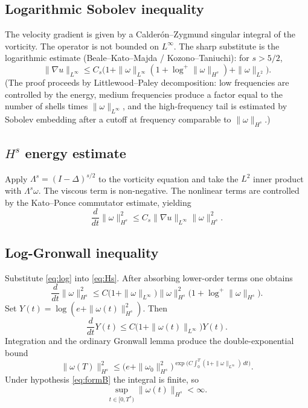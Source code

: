 \documentclass[11pt,a4paper]{article}
\begin{document}
\subsection{Logarithmic Sobolev inequality}
The velocity gradient is given by a Calder\'on--Zygmund singular integral of the vorticity. The operator is not bounded on \(L^\infty\). The sharp substitute is the logarithmic estimate (Beale--Kato--Majda / Kozono--Taniuchi): for \(s>5/2\),
\begin{equation}\label{eq:log}
\|\nabla u\|_{L^\infty}
\le C_s\bigl(1+\|\omega\|_{L^\infty}(1+\log^+\|\omega\|_{H^s})+\|\omega\|_{L^2}\bigr).
\end{equation}
(The proof proceeds by Littlewood--Paley decomposition: low frequencies are controlled by the energy, medium frequencies produce a factor equal to the number of shells times \(\|\omega\|_{L^\infty}\), and the high-frequency tail is estimated by Sobolev embedding after a cutoff at frequency comparable to \(\|\omega\|_{H^s}\).)

\subsection{\(H^s\) energy estimate}
Apply \(\Lambda^s=(I-\Delta)^{s/2}\) to the vorticity equation and take the \(L^2\) inner product with \(\Lambda^s\omega\). The viscous term is non-negative. The nonlinear terms are controlled by the Kato--Ponce commutator estimate, yielding
\begin{equation}\label{eq:Hs}
\frac{d}{dt}\|\omega\|_{H^s}^2\le C_s\|\nabla u\|_{L^\infty}\|\omega\|_{H^s}^2.
\end{equation}

\subsection{Log-Gronwall inequality}
Substitute \eqref{eq:log} into \eqref{eq:Hs}. After absorbing lower-order terms one obtains
\begin{equation}
\frac{d}{dt}\|\omega\|_{H^s}^2
\le C\bigl(1+\|\omega\|_{L^\infty}\bigr)\|\omega\|_{H^s}^2\bigl(1+\log^+\|\omega\|_{H^s}\bigr).
\end{equation}
Set \(Y(t)=\log(e+\|\omega(t)\|_{H^s}^2)\). Then
\begin{equation}
\frac{d}{dt}Y(t)\le C\bigl(1+\|\omega(t)\|_{L^\infty}\bigr)Y(t).
\end{equation}
Integration and the ordinary Gronwall lemma produce the double-exponential bound
\begin{equation}
\|\omega(T)\|_{H^s}^2
\le\bigl(e+\|\omega_0\|_{H^s}^2\bigr)^{\exp\bigl(C\int_0^T(1+\|\omega\|_{L^\infty})\,dt\bigr)}.
\end{equation}
Under hypothesis \eqref{eq:formB} the integral is finite, so
\[
\sup_{t\in[0,T^*)}\|\omega(t)\|_{H^s}<\infty.
\]
\end{document}
